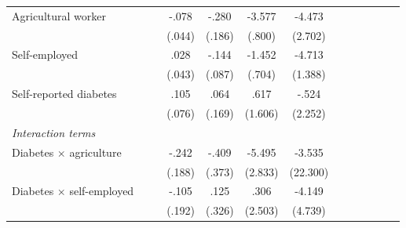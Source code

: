 \documentclass[12pt,english]{article}
\begin{document}
\begin{table}[p]
\begin{center}
\begin{adjustbox}{max width=\linewidth}
\begin{threeparttable}
{\begin{tabular}{l*{6}{S
								S}}
						Agricultural worker&         &         &    -.078\sym{*}  &    -.280         &   -3.577\sym{***}&   -4.473\sym{*}  \\
						&         &         &   (.044)         &   (.186)         &   (.800)         &  (2.702)         \\
						Self-employed   &         &         &     .028         &    -.144\sym{*}  &   -1.452\sym{**} &   -4.713\sym{***}\\
						&         &         &   (.043)         &   (.087)         &   (.704)         &  (1.388)         \\
						Self-reported diabetes&         &         &     .105         &     .064         &     .617         &    -.524         \\
						&         &         &   (.076)         &   (.169)         &  (1.606)         &  (2.252)         \\
						\textit{Interaction terms} &&&&&&\\                
						\hspace*{5mm}Diabetes $\times$ agriculture&         &         &    -.242         &    -.409         &   -5.495\sym{*}  &   -3.535         \\
						&         &         &   (.188)         &   (.373)         &  (2.833)         & (22.300)         \\
						\hspace*{5mm}Diabetes $\times$ self-employed&         &         &    -.105         &     .125         &     .306         &   -4.149         \\
						&         &         &   (.192)         &   (.326)         &  (2.503)         &  (4.739)         \\
						

\end{tabular}}
\end{threeparttable}
\end{adjustbox}
\end{center}
\end{table}
\end{document}
